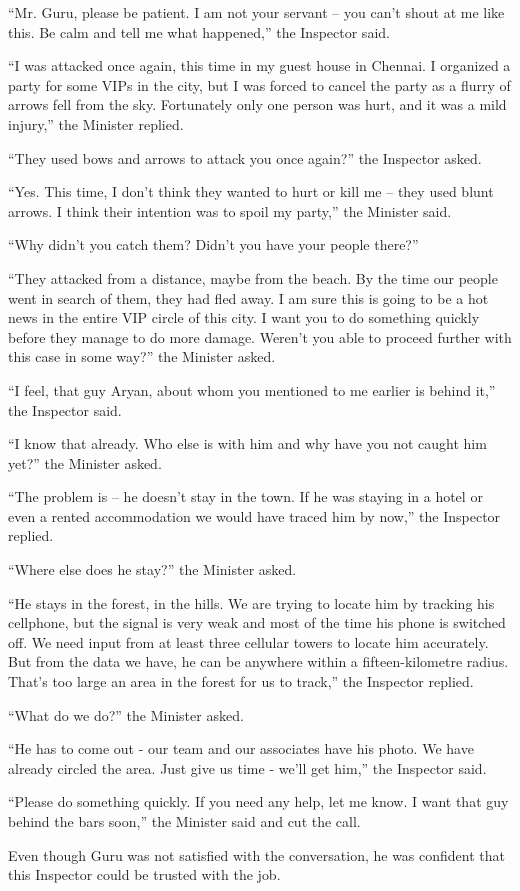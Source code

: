 “Mr. Guru, please be patient. I am not your servant – you can't shout at me like
this. Be calm and tell me what happened,” the Inspector said.

“I was attacked once again, this time in my guest house in Chennai. I organized
a party for some VIPs in the city, but I was forced to cancel the party as a
flurry of arrows fell from the sky. Fortunately only one person was hurt, and it
was a mild injury,” the Minister replied.

“They used bows and arrows to attack you once again?” the Inspector asked.

“Yes. This time, I don't think they wanted to hurt or kill me – they used blunt
arrows. I think their intention was to spoil my party,” the Minister said.

“Why didn't you catch them? Didn't you have your people there?”

“They attacked from a distance, maybe from the beach. By the time our people
went in search of them, they had fled away. I am sure this is going to be a hot
news in the entire VIP circle of this city. I want you to do something quickly
before they manage to do more damage. Weren't you able to proceed further with
this case in some way?” the Minister asked.

“I feel, that guy Aryan, about whom you mentioned to me earlier is behind it,”
the Inspector said.

“I know that already. Who else is with him and why have you not caught him yet?”
the Minister asked.

“The problem is – he doesn't stay in the town. If he was staying in a hotel or
even a rented accommodation we would have traced him by now,” the Inspector
replied.

“Where else does he stay?” the Minister asked.

“He stays in the forest, in the hills. We are trying to locate him by tracking
his cellphone, but the signal is very weak and most of the time his phone is
switched off. We need input from at least three cellular towers to locate him
accurately. But from the data we have, he can be anywhere within a
fifteen-kilometre radius. That's too large an area in the forest for us to
track,” the Inspector replied.

“What do we do?” the Minister asked.

“He has to come out - our team and our associates have his photo. We have
already circled the area. Just give us time - we'll get him,” the Inspector
said.

“Please do something quickly. If you need any help, let me know. I want that guy
behind the bars soon,” the Minister said and cut the call.

Even though Guru was not satisfied with the conversation, he was confident that
this Inspector could be trusted with the job.